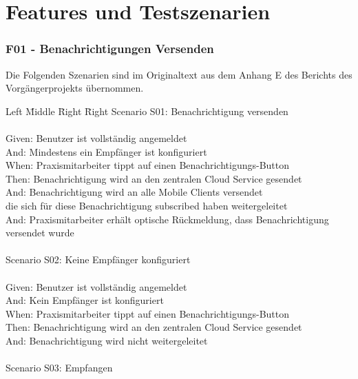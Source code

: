 \section{Features und Testszenarien}

\subsubsection*{F01 - Benachrichtigungen Versenden}

Die Folgenden Szenarien sind im Originaltext aus dem Anhang E des Berichts des Vorgängerprojekts übernommen.\cite{ip5}

\begin{tabbing}
    Left \= Middle \= Right \= Right \kill
    Scenario S01: \> \> \> Benachrichtigung versenden\\ \\
    Given:  \> \> \> Benutzer ist vollständig angemeldet\\
    And: \>    \> \> Mindestens ein Empfänger ist konfiguriert\\
    When:   \> \> \> Praxismitarbeiter tippt auf einen Benachrichtigungs-Button\\
    Then:   \> \> \> Benachrichtigung wird an den zentralen Cloud Service gesendet\\
    And: \>    \> \> Benachrichtigung wird an alle Mobile Clients versendet\\
    \> \>  \> die sich für diese Benachrichtigung subscribed haben weitergeleitet\\
    And:   \> \> \> Praxismitarbeiter erhält optische Rückmeldung, dass Benachrichtigung versendet wurde\\
    \\
    Scenario S02: \>  \> \> Keine Empfänger konfiguriert\\ \\
    Given:  \> \> \> Benutzer ist vollständig angemeldet\\
    And:  \> \>   \> Kein Empfänger ist konfiguriert\\
    When:  \> \>  \> Praxismitarbeiter tippt auf einen Benachrichtigungs-Button\\
    Then:  \> \>  \> Benachrichtigung wird an den zentralen Cloud Service gesendet\\
    And:  \> \>   \> Benachrichtigung wird nicht weitergeleitet\\
    \\
    Scenario S03: \>  \> \> Empfangen\\ \\

\end{tabbing}
